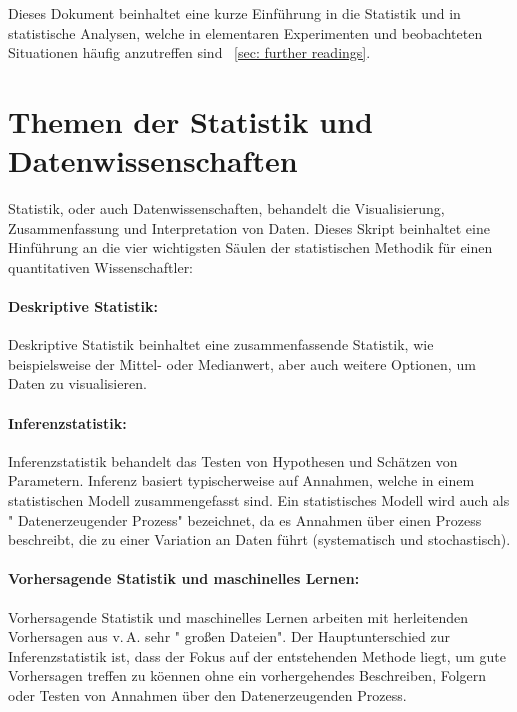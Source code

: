 \documentclass[a4paper,twoside]{tufte-book}\usepackage[]{graphicx}\usepackage[]{color}
\begin{document}
Dieses Dokument beinhaltet eine kurze Einführung in die Statistik und in statistische Analysen, welche in elementaren Experimenten und beobachteten Situationen häufig anzutreffen sind ~\ref{sec: further readings}.

\section{Themen der Statistik und Datenwissenschaften}

Statistik, oder auch Datenwissenschaften, behandelt die Visualisierung, Zusammenfassung und Interpretation von Daten. Dieses Skript beinhaltet eine Hinführung an die vier wichtigsten Säulen der statistischen Methodik für einen quantitativen Wissenschaftler:

\paragraph{Deskriptive Statistik:} Deskriptive Statistik beinhaltet eine zusammenfassende Statistik, wie beispielsweise der Mittel- oder Medianwert, aber auch weitere Optionen, um Daten zu visualisieren.

\paragraph{Inferenzstatistik:} Inferenzstatistik behandelt das Testen von Hypothesen und Schätzen von Parametern. Inferenz basiert typischerweise auf Annahmen, welche in einem statistischen Modell zusammengefasst sind. Ein statistisches Modell wird auch als " Datenerzeugender Prozess" bezeichnet, da es Annahmen über einen Prozess beschreibt, die zu einer Variation an Daten führt (systematisch und stochastisch).

\paragraph{Vorhersagende Statistik und maschinelles Lernen:} Vorhersagende Statistik und maschinelles Lernen arbeiten mit herleitenden Vorhersagen aus v.\,A. sehr " großen Dateien". Der Hauptunterschied zur Inferenzstatistik ist, dass der Fokus auf der entstehenden Methode liegt, um gute Vorhersagen treffen zu köennen ohne ein vorhergehendes Beschreiben, Folgern oder Testen von Annahmen über den Datenerzeugenden Prozess.
\end{document}
